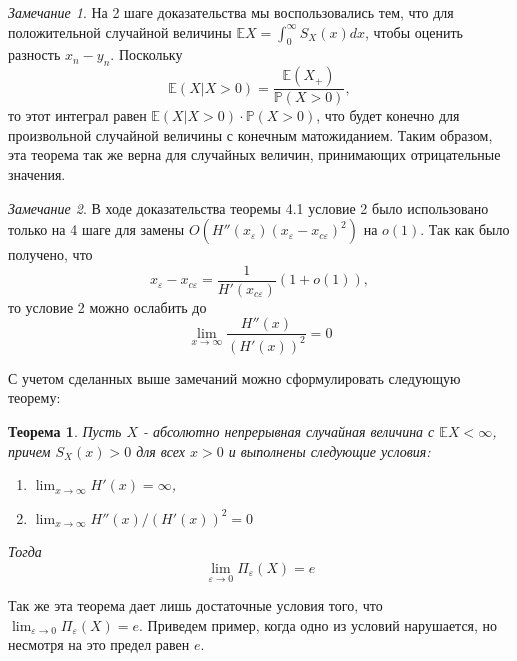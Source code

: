 \documentclass[12pt]{article}
\theoremstyle{plain}
\newtheorem{theorem}{Теорема}[section]
\theoremstyle{definition}
\theoremstyle{remark}
\newtheorem{remark}{Замечание}[section]
\begin{document}
\begin{remark}
    На 2 шаге доказательства мы воспользовались тем, что для положительной случайной величины $\mathbb{E}X = \int_0^{\infty}S_X(x)dx$, чтобы оценить разность $x_n - y_n$. Поскольку 
    \[
        \mathbb{E}(X | X > 0) = \frac{\mathbb{E}(X_{+})}{\mathbb{P}(X > 0)},
    \]
    то этот интеграл равен $\mathbb{E}(X | X > 0)\cdot\mathbb{P}(X > 0)$, что будет конечно для произвольной случайной величины с конечным матожиданием. Таким образом, эта теорема так же верна для случайных величин, принимающих отрицательные значения.
\end{remark}
\begin{remark}
    В ходе доказательства теоремы 4.1 условие 2 было использовано только на 4 шаге для замены $O(H''(x_{\varepsilon})(x_{\varepsilon} - x_{c\varepsilon})^2)$ на $o(1)$. Так как было получено, что
    \[
        x_{\varepsilon} - x_{c\varepsilon} =\frac{1}{H'(x_{c\varepsilon})}(1+o(1)),
    \]
    то условие 2 можно ослабить до 
    \[
        \lim_{x\to \infty}\frac{H''(x)}{(H'(x))^2} = 0
    \]
\end{remark}

С учетом сделанных выше замечаний можно сформулировать следующую теорему:
\begin{theorem}
    Пусть $X$ - абсолютно непрерывная случайная величина с $\mathbb{E}X < \infty$, причем $S_X(x) > 0$ для всех $x > 0$ и выполнены следующие условия:
    \begin{enumerate}
        \item $\lim_{x\to \infty}H'(x) = \infty$,
        \item $\lim_{x\to \infty}H''(x)/(H'(x))^2 = 0$
    \end{enumerate}
    Тогда
    \[
        \lim_{\varepsilon \to 0}\Pi_\varepsilon(X) = e
    \]
\end{theorem}

Так же эта теорема дает лишь достаточные условия того, что $\lim_{\varepsilon \to 0}\Pi_\varepsilon(X) = e$. Приведем пример, когда одно из условий нарушается, но несмотря на это предел равен $e$. 
\end{document}
